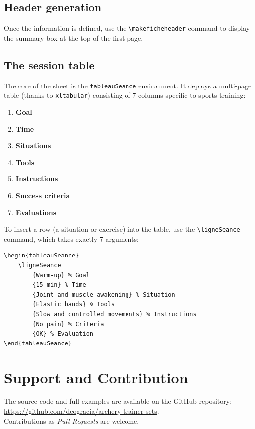\documentclass[a4paper,11pt]{article}
\begin{document}
\subsection{Header generation}
Once the information is defined, use the \verb|\makeficheheader| command to display the summary box at the top of the first page.

\subsection{The session table}
The core of the sheet is the \texttt{tableauSeance} environment. It deploys a multi-page table (thanks to \texttt{xltabular}) consisting of 7 columns specific to sports training:
\begin{enumerate}
    \item \textbf{Goal}
    \item \textbf{Time}
    \item \textbf{Situations}
    \item \textbf{Tools}
    \item \textbf{Instructions}
    \item \textbf{Success criteria}
    \item \textbf{Evaluations}
\end{enumerate}

To insert a row (a situation or exercise) into the table, use the \verb|\ligneSeance| command, which takes exactly 7 arguments:
\begin{lstlisting}
\begin{tableauSeance}
    \ligneSeance
        {Warm-up} % Goal
        {15 min} % Time
        {Joint and muscle awakening} % Situation
        {Elastic bands} % Tools
        {Slow and controlled movements} % Instructions
        {No pain} % Criteria
        {OK} % Evaluation
\end{tableauSeance}
\end{lstlisting}

\section{Support and Contribution}
The source code and full examples are available on the GitHub repository:\\ \url{https://github.com/deogracia/archery-trainer-sets}.\\
Contributions as \textit{Pull Requests} are welcome.
\end{document}
